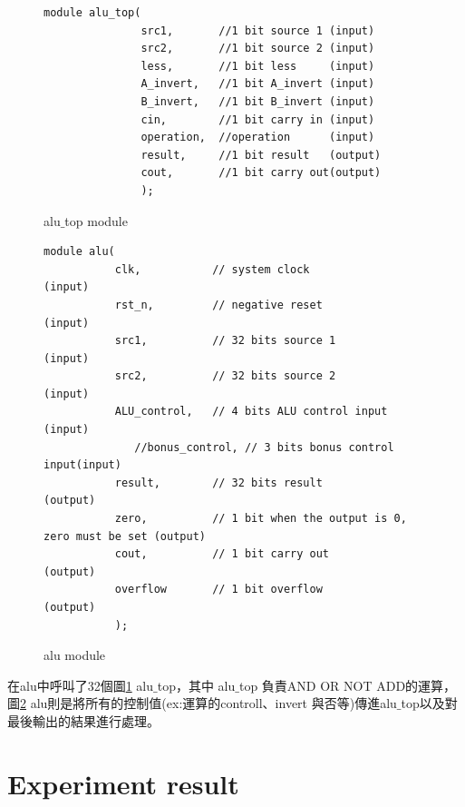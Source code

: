 \documentclass[12pt,a4paper]{article}
\theoremstyle{definition}
\begin{document}
\begin{figure}[H]
\centering
\begin{lstlisting}[caption={}]
module alu_top(
               src1,       //1 bit source 1 (input)
               src2,       //1 bit source 2 (input)
               less,       //1 bit less     (input)
               A_invert,   //1 bit A_invert (input)
               B_invert,   //1 bit B_invert (input)
               cin,        //1 bit carry in (input)
               operation,  //operation      (input)
               result,     //1 bit result   (output)
               cout,       //1 bit carry out(output)
               );
\end{lstlisting}
\caption{alu$\_$top module}
\label{fig:alu_top_}
\end{figure}

\begin{figure}[H]
\centering
\begin{lstlisting}[caption={}]
module alu(
           clk,           // system clock              (input)
           rst_n,         // negative reset            (input)
           src1,          // 32 bits source 1          (input)
           src2,          // 32 bits source 2          (input)
           ALU_control,   // 4 bits ALU control input  (input)
			  //bonus_control, // 3 bits bonus control input(input) 
           result,        // 32 bits result            (output)
           zero,          // 1 bit when the output is 0, zero must be set (output)
           cout,          // 1 bit carry out           (output)
           overflow       // 1 bit overflow            (output)
           );
\end{lstlisting}
\caption{alu module}
\label{fig:alu_}
\end{figure}

在alu中呼叫了32個圖\ref{fig:alu_top_} alu$\_$top，其中 alu$\_$top 負責AND OR NOT ADD的運算，圖\ref{fig:alu_} alu則是將所有的控制值(ex:運算的controll、invert 與否等)傳進alu$\_$top以及對最後輸出的結果進行處理。

\section{Experiment result}
\end{document}
